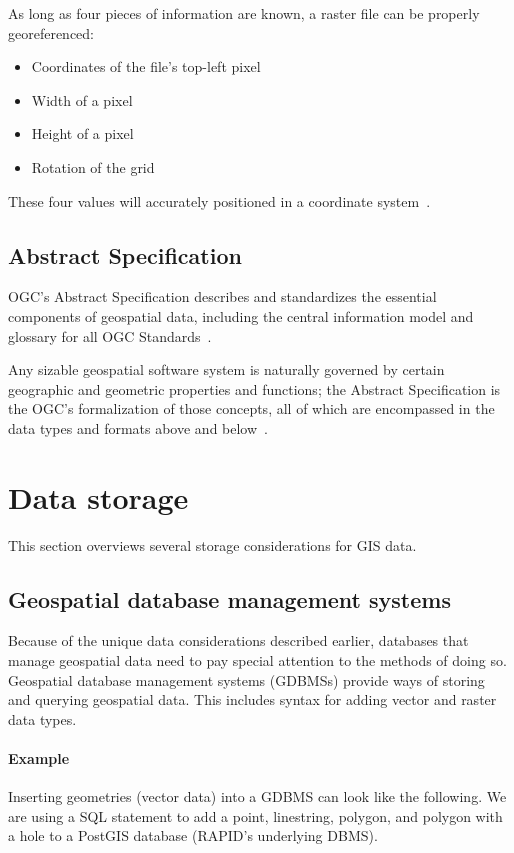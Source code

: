 As long as four pieces of information are known, a raster file can be properly georeferenced:

\begin{itemize}
  \item Coordinates of the file's top-left pixel
  \item Width of a pixel
  \item Height of a pixel
  \item Rotation of the grid
\end{itemize}

These four values will accurately positioned in a coordinate system~\cite{gentle_intro}.

\subsection{Abstract Specification}
OGC's Abstract Specification describes and standardizes the essential components of geospatial data, including the central information model and glossary for all OGC Standards~\cite{AbstractSpecFaq}.

Any sizable geospatial software system is naturally governed by certain geographic and geometric properties and functions; the Abstract Specification is the OGC's formalization of those concepts, all of which are encompassed in the data types and formats above and below~\cite{AbstractSpecFaq}.

\section{Data storage}
This section overviews several storage considerations for GIS data.

\subsection{Geospatial database management systems}
Because of the unique data considerations described earlier, databases that manage geospatial data need to pay special attention to the methods of doing so. Geospatial database management systems (GDBMSs) provide ways of storing and querying geospatial data. This includes syntax for adding vector and raster data types.

\paragraph{Example}
\label{background_wkt}
Inserting geometries (vector data) into a GDBMS can look like the following. We are using a SQL statement to add a point, linestring, polygon, and polygon with a hole to a PostGIS database (RAPID's underlying DBMS).

